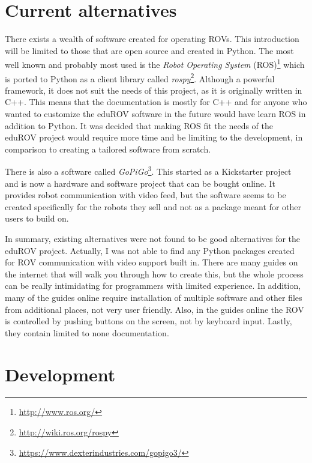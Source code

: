 \section{Current alternatives}

There exists a wealth of software created for operating ROVs. This introduction will be limited to those that are open source and created in Python. The most well known and probably most used is the \emph{Robot Operating System} (ROS)\footnote{\url{http://www.ros.org/}} which is ported to Python as a client library called \emph{rospy}\footnote{\url{http://wiki.ros.org/rospy}}. Although a powerful framework, it does not suit the needs of this project, as it is originally written in C++. This means that the documentation is mostly for C++ and for anyone who wanted to customize the eduROV software in the future would have learn ROS in addition to Python. It was decided that making ROS fit the needs of the eduROV project would require more time and be limiting to the development, in comparison to creating a tailored software from scratch.

There is also a software called \emph{GoPiGo}\footnote{\url{https://www.dexterindustries.com/gopigo3/}}. This started as a Kickstarter project and is now a hardware and software project that can be bought online. It provides robot communication with video feed, but the software seems to be created specifically for the robots they sell and not as a package meant for other users to build on.

In summary, existing alternatives were not found to be good alternatives for the eduROV project. Actually, I was not able to find any Python packages created for ROV communication with video support built in. There are many guides on the internet that will walk you through how to create this, but the whole process can be really intimidating for programmers with limited experience. In addition, many of the guides online require installation of multiple software and other files from additional places, not very user friendly. Also, in the guides online the ROV is controlled by pushing buttons on the screen, not by keyboard input. Lastly, they contain limited to none documentation.

\vspace{-3mm}
\section{Development}
\vspace{-2mm}

